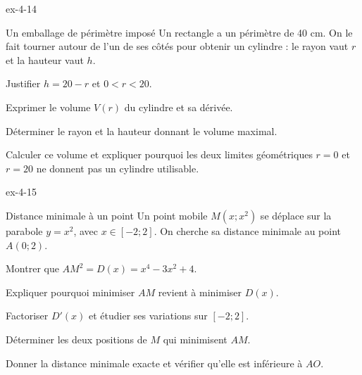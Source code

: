 \begin{blocLivre}{ex-4-14}
\begin{exercice}[3]{Un emballage de périmètre imposé}
Un rectangle a un périmètre de 40 cm. On le fait tourner autour de l'un de
ses côtés pour obtenir un cylindre : le rayon vaut $r$ et la hauteur vaut $h$.
\begin{questions}\item Justifier $h=20-r$ et $0<r<20$.
\item Exprimer le volume $V(r)$ du cylindre et sa dérivée.
\item Déterminer le rayon et la hauteur donnant le volume maximal.
\item Calculer ce volume et expliquer pourquoi les deux limites géométriques
$r=0$ et $r=20$ ne donnent pas un cylindre utilisable.
\end{questions}
\label{figlivre-r04-14-cylindre-ex}

\end{exercice}
\end{blocLivre}
\begin{blocLivre}{ex-4-15}
\begin{exercice}[3]{Distance minimale à un point}
Un point mobile $M(x;x^2)$ se déplace sur la parabole $y=x^2$, avec $x\in[-2;2]$.
On cherche sa distance minimale au point $A(0;2)$.
\begin{questions}\item Montrer que $AM^2=D(x)=x^4-3x^2+4$.
\item Expliquer pourquoi minimiser $AM$ revient à minimiser $D(x)$.
\end{questions}
\begin{questions}[resume]\item Factoriser $D'(x)$ et étudier ses variations sur $[-2;2]$.
\item Déterminer les deux positions de $M$ qui minimisent $AM$.
\item Donner la distance minimale exacte et vérifier qu'elle est inférieure à $AO$.
\end{questions}
\label{figlivre-r04-15-distance-ex}

\end{exercice}
\end{blocLivre}
